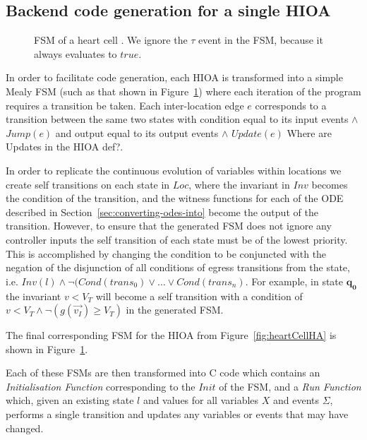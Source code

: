 \subsection{Backend code generation for a single \ac{HIOA}}
\label{sec:backendCodeGeneration}

\begin{figure}
  \centering
  
  \caption{\acf{FSM} of a heart cell \label{fig:heartCellFSM}. We ignore
    the $\tau$ event in the \ac{FSM}, because it always evaluates to $true$.}
\end{figure}

In order to facilitate code generation, each \ac{HIOA} is transformed into a 
simple Mealy \ac{FSM} (such as that shown in Figure~\ref{fig:heartCellFSM}) 
where each iteration of the program requires a transition be taken.  Each 
inter-location edge $e$ corresponds to a transition between the same two states 
with condition equal to its input events $\wedge$ $Jump(e)$ and output equal to 
its output events $\wedge$ $Update(e)$ {\color{red} Where are Updates in the 
HIOA def?}.

In order to replicate the continuous evolution of variables within locations we 
create self transitions on each state in $Loc$, where the invariant in $Inv$ 
becomes the condition of the transition, and the witness functions for each of 
the \acs{ODE} described in Section~\ref{sec:converting-odes-into} become the 
output of the transition. However, to ensure that the generated \ac{FSM} does 
not ignore any controller inputs the self transition of each state must be of 
the lowest priority.  This is accomplished by changing the condition to be 
conjuncted with the negation of the disjunction of all conditions of egress 
transitions from the state, i.e. $Inv(l) \wedge \neg (Cond(trans_{0}) \vee 
\dots \vee Cond(trans_{n})$.  For example, in state $\mathbf{q_0}$ the 
invariant $v < V_{T}$ will become a self transition with a condition of $v < 
V_{T} \wedge \neg (g(\vec{v_{I}}) \geq V_{T})$ in the generated \ac{FSM}.

The final corresponding \ac{FSM} for the \ac{HIOA} from 
Figure~\ref{fig:heartCellHA} is shown in Figure~\ref{fig:heartCellFSM}.

Each of these \acp{FSM} are then transformed into C code which contains an 
\emph{Initialisation Function} corresponding to the $Init$ of the \ac{FSM}, and 
a \emph{Run Function} which, given an existing state $l$ and values for all 
variables $X$ and events $\Sigma$, performs a single transition and updates any 
variables or events that may have changed.

